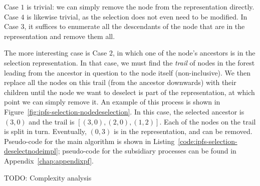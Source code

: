 \noindent Case $1$ is trivial: we can simply remove the node from the representation directly. Case $4$ is likewise trivial, as the selection does not even need to be modified. In Case $3$, it suffices to enumerate all the descendants of the node that are in the representation and remove them all.

The more interesting case is Case $2$, in which one of the node's ancestors is in the selection representation. In that case, we must find the \emph{trail} of nodes in the forest leading from the ancestor in question to the node itself (non-inclusive). We then replace all the nodes on this trail (from the ancestor downwards) with their children until the node we want to deselect is part of the representation, at which point we can simply remove it. An example of this process is shown in Figure~\ref{fig:ipfs-selection-nodedeselection}. In this case, the selected ancestor is $(3,0)$ and the trail is $[(3,0), (2,0), (1,2)]$. Each of the nodes on the trail is split in turn. Eventually, $(0,3)$ is in the representation, and can be removed. Pseudo-code for the main algorithm is shown in Listing~\ref{code:ipfs-selection-deselectnodeimpl}; pseudo-code for the subsidiary processes can be found in Appendix~\ref{chap:appendixpf}.

TODO: Complexity analysis

